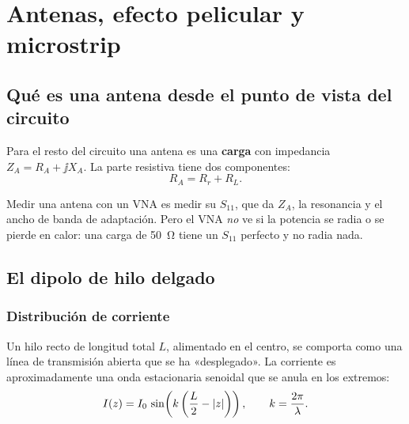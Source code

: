 \chapter{Antenas, efecto pelicular y microstrip}

\section{Qué es una antena desde el punto de vista del circuito}

Para el resto del circuito una antena es una \textbf{carga} con impedancia $Z_A = R_A + \jj X_A$. La parte resistiva tiene dos componentes:
\begin{equation}
  R_A = R_r + R_L .
\end{equation}
\begin{donde}
\end{donde}
Medir una antena con un VNA es medir su $S_{11}$, que da $Z_A$, la resonancia y el ancho de banda de adaptación. Pero el VNA \emph{no} ve
si la potencia se radia o se pierde en calor: una carga de \SI{50}{\ohm} tiene un $S_{11}$ perfecto y no radia nada.

\section{El dipolo de hilo delgado}

\subsection{Distribución de corriente}
Un hilo recto de longitud total $L$, alimentado en el centro, se comporta como una línea de transmisión abierta que se ha «desplegado».
La corriente es aproximadamente una onda estacionaria senoidal que se anula en los extremos:
\begin{equation}
  I(z) = I_0\,\sin\!\left(k\left(\frac L2 - \left|z\right|\right)\right), \qquad k = \frac{2\pi}{\lambda}.
\end{equation}
\begin{donde}
\end{donde}


